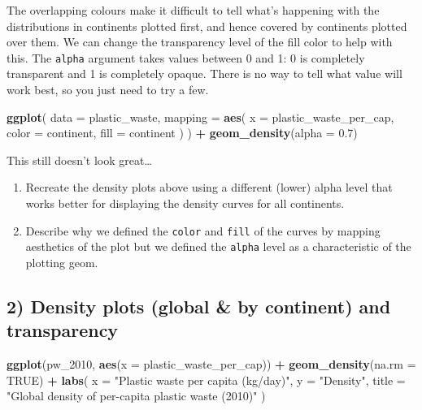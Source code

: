 \documentclass[
]{article}
\newenvironment{Shaded}{\begin{snugshade}}{\end{snugshade}}
\newcommand{\AttributeTok}[1]{\textcolor[rgb]{0.13,0.29,0.53}{#1}}
\newcommand{\ConstantTok}[1]{\textcolor[rgb]{0.56,0.35,0.01}{#1}}
\newcommand{\FloatTok}[1]{\textcolor[rgb]{0.00,0.00,0.81}{#1}}
\newcommand{\FunctionTok}[1]{\textcolor[rgb]{0.13,0.29,0.53}{\textbf{#1}}}
\newcommand{\NormalTok}[1]{#1}
\newcommand{\SpecialCharTok}[1]{\textcolor[rgb]{0.81,0.36,0.00}{\textbf{#1}}}
\newcommand{\StringTok}[1]{\textcolor[rgb]{0.31,0.60,0.02}{#1}}
\begin{document}
The overlapping colours make it difficult to tell what's happening with
the distributions in continents plotted first, and hence covered by
continents plotted over them. We can change the transparency level of
the fill color to help with this. The \texttt{alpha} argument takes
values between 0 and 1: 0 is completely transparent and 1 is completely
opaque. There is no way to tell what value will work best, so you just
need to try a few.

\begin{Shaded}
\begin{Highlighting}[]
\FunctionTok{ggplot}\NormalTok{(}
  \AttributeTok{data =}\NormalTok{ plastic\_waste,}
  \AttributeTok{mapping =} \FunctionTok{aes}\NormalTok{(}
    \AttributeTok{x =}\NormalTok{ plastic\_waste\_per\_cap,}
    \AttributeTok{color =}\NormalTok{ continent,}
    \AttributeTok{fill =}\NormalTok{ continent}
\NormalTok{  )}
\NormalTok{) }\SpecialCharTok{+}
  \FunctionTok{geom\_density}\NormalTok{(}\AttributeTok{alpha =} \FloatTok{0.7}\NormalTok{)}
\end{Highlighting}
\end{Shaded}

This still doesn't look great\ldots{}

\begin{enumerate}
\def\labelenumi{\arabic{enumi}.}
\item
  Recreate the density plots above using a different (lower) alpha level
  that works better for displaying the density curves for all
  continents.
\item
  Describe why we defined the \texttt{color} and \texttt{fill} of the
  curves by mapping aesthetics of the plot but we defined the
  \texttt{alpha} level as a characteristic of the plotting geom.
\end{enumerate}

\subsection{2) Density plots (global \& by continent) and
transparency}\label{density-plots-global-by-continent-and-transparency}

\begin{Shaded}
\begin{Highlighting}[]
\FunctionTok{ggplot}\NormalTok{(pw\_2010, }\FunctionTok{aes}\NormalTok{(}\AttributeTok{x =}\NormalTok{ plastic\_waste\_per\_cap)) }\SpecialCharTok{+}
  \FunctionTok{geom\_density}\NormalTok{(}\AttributeTok{na.rm =} \ConstantTok{TRUE}\NormalTok{) }\SpecialCharTok{+}
  \FunctionTok{labs}\NormalTok{(}
    \AttributeTok{x =} \StringTok{"Plastic waste per capita (kg/day)"}\NormalTok{, }\AttributeTok{y =} \StringTok{"Density"}\NormalTok{,}
    \AttributeTok{title =} \StringTok{"Global density of per{-}capita plastic waste (2010)"}
\NormalTok{  )}
\end{Highlighting}
\end{Shaded}
\end{document}
